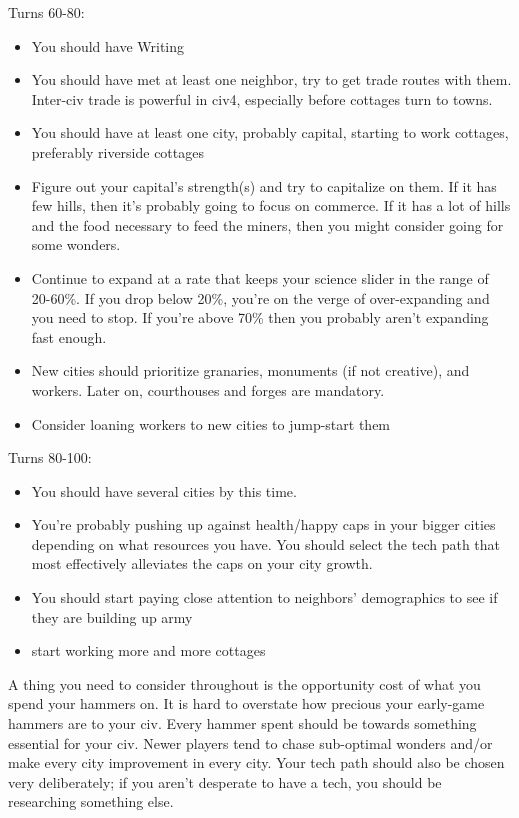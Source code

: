 \documentclass[10pt]{article}
\begin{document}
Turns 60-80:
\begin{itemize}
\item You should have Writing
\item You should have met at least one neighbor, try to get trade routes with them. Inter-civ trade is powerful in civ4, especially
  before cottages turn to towns.
\item You should have at least one city, probably capital, starting to work cottages, preferably riverside cottages
\item Figure out your capital's strength(s) and try to capitalize on them. If it has few hills, then it's probably
  going to focus on commerce. If it has a lot of hills and the food necessary to feed the miners, then you might
  consider going for some wonders.
\item Continue to expand at a rate that keeps your science slider in the range of 20-60\%. If you drop below 20\%,
  you're on the verge of over-expanding and you need to stop. If you're above 70\% then you probably aren't
  expanding fast enough.
\item New cities should prioritize granaries, monuments (if not creative), and workers. Later on, courthouses and forges are mandatory.
\item Consider loaning workers to new cities to jump-start them
\end{itemize}

Turns 80-100:
\begin{itemize}
\item You should have several cities by this time.
\item You're probably pushing up against health/happy caps in your bigger cities depending on what
  resources you have. You should select the tech path that most effectively alleviates the caps
  on your city growth.
\item You should start paying close attention to neighbors' demographics to see if they are building up army
\item start working more and more cottages
\end{itemize}

A thing you need to consider throughout is the opportunity cost of
what you spend your hammers on. It is hard to overstate how precious
your early-game hammers are to your civ. Every hammer spent should be
towards something essential for your civ. Newer players tend to chase
sub-optimal wonders and/or make every city improvement in every
city. Your tech path should also be chosen very deliberately; if you
aren't desperate to have a tech, you should be researching something
else.
\end{document}
